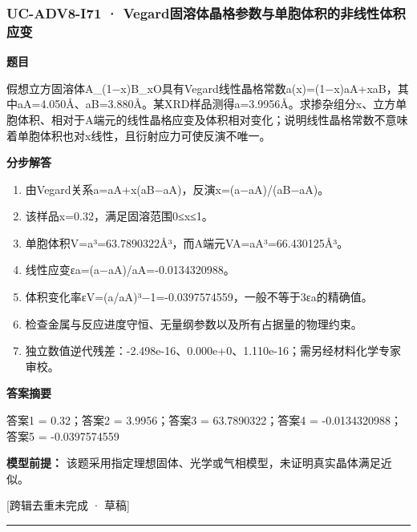 \documentclass[UTF8,11pt,a4paper]{ctexart}
\begin{document}
\subsubsection*{UC-ADV8-I71 · Vegard固溶体晶格参数与单胞体积的非线性体积应变}
\noindent\textbf{题目}\par
假想立方固溶体A\_(1−x)B\_xO具有Vegard线性晶格常数a(x)=(1−x)aA+xaB，其中aA=4.050Å、aB=3.880Å。某XRD样品测得a=3.9956Å。求掺杂组分x、立方单胞体积、相对于A端元的线性晶格应变及体积相对变化；说明线性晶格常数不意味着单胞体积也对x线性，且衍射应力可使反演不唯一。\par
\medskip\noindent\textbf{分步解答}
\begin{enumerate}
\item 由Vegard关系a=aA+x(aB−aA)，反演x=(a−aA)/(aB−aA)。
\item 该样品x=0.32，满足固溶范围0≤x≤1。
\item 单胞体积V=a³=63.7890322Å³，而A端元VA=aA³=66.430125Å³。
\item 线性应变εa=(a−aA)/aA=-0.0134320988。
\item 体积变化率εV=(a/aA)³−1=-0.0397574559，一般不等于3εa的精确值。
\item 检查金属与反应进度守恒、无量纲参数以及所有占据量的物理约束。
\item 独立数值逆代残差：-2.498e-16、0.000e+0、1.110e-16；需另经材料化学专家审校。
\end{enumerate}
\noindent\textbf{答案摘要}\par
答案1 = 0.32；答案2 = 3.9956；答案3 = 63.7890322；答案4 = -0.0134320988；答案5 = -0.0397574559\par
\noindent\textbf{模型前提：}
该题采用指定理想固体、光学或气相模型，未证明真实晶体满足近似。\par
\noindent\textcolor{red!65!black}{[跨辑去重未完成 · 草稿]} \par
\medskip\hrule\medskip
{}
\end{document}
